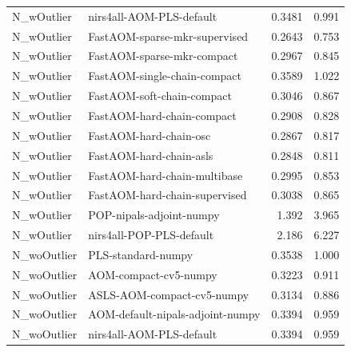 \begin{landscape}
\begin{longtable}{L{8.0cm}L{9.5cm}rr}
N\_\allowbreak{}wOutlier & nirs4all-\allowbreak{}AOM-\allowbreak{}PLS-\allowbreak{}default & 0.3481 & 0.991 \\
N\_\allowbreak{}wOutlier & FastAOM-\allowbreak{}sparse-\allowbreak{}mkr-\allowbreak{}supervised & 0.2643 & 0.753 \\
N\_\allowbreak{}wOutlier & FastAOM-\allowbreak{}sparse-\allowbreak{}mkr-\allowbreak{}compact & 0.2967 & 0.845 \\
N\_\allowbreak{}wOutlier & FastAOM-\allowbreak{}single-\allowbreak{}chain-\allowbreak{}compact & 0.3589 & 1.022 \\
N\_\allowbreak{}wOutlier & FastAOM-\allowbreak{}soft-\allowbreak{}chain-\allowbreak{}compact & 0.3046 & 0.867 \\
N\_\allowbreak{}wOutlier & FastAOM-\allowbreak{}hard-\allowbreak{}chain-\allowbreak{}compact & 0.2908 & 0.828 \\
N\_\allowbreak{}wOutlier & FastAOM-\allowbreak{}hard-\allowbreak{}chain-\allowbreak{}osc & 0.2867 & 0.817 \\
N\_\allowbreak{}wOutlier & FastAOM-\allowbreak{}hard-\allowbreak{}chain-\allowbreak{}asls & 0.2848 & 0.811 \\
N\_\allowbreak{}wOutlier & FastAOM-\allowbreak{}hard-\allowbreak{}chain-\allowbreak{}multibase & 0.2995 & 0.853 \\
N\_\allowbreak{}wOutlier & FastAOM-\allowbreak{}hard-\allowbreak{}chain-\allowbreak{}supervised & 0.3038 & 0.865 \\
N\_\allowbreak{}wOutlier & POP-\allowbreak{}nipals-\allowbreak{}adjoint-\allowbreak{}numpy & 1.392 & 3.965 \\
N\_\allowbreak{}wOutlier & nirs4all-\allowbreak{}POP-\allowbreak{}PLS-\allowbreak{}default & 2.186 & 6.227 \\
N\_\allowbreak{}woOutlier & PLS-\allowbreak{}standard-\allowbreak{}numpy & 0.3538 & 1.000 \\
N\_\allowbreak{}woOutlier & AOM-\allowbreak{}compact-\allowbreak{}cv5-\allowbreak{}numpy & 0.3223 & 0.911 \\
N\_\allowbreak{}woOutlier & ASLS-\allowbreak{}AOM-\allowbreak{}compact-\allowbreak{}cv5-\allowbreak{}numpy & 0.3134 & 0.886 \\
N\_\allowbreak{}woOutlier & AOM-\allowbreak{}default-\allowbreak{}nipals-\allowbreak{}adjoint-\allowbreak{}numpy & 0.3394 & 0.959 \\
N\_\allowbreak{}woOutlier & nirs4all-\allowbreak{}AOM-\allowbreak{}PLS-\allowbreak{}default & 0.3394 & 0.959 \\

\end{longtable}
\end{landscape}
